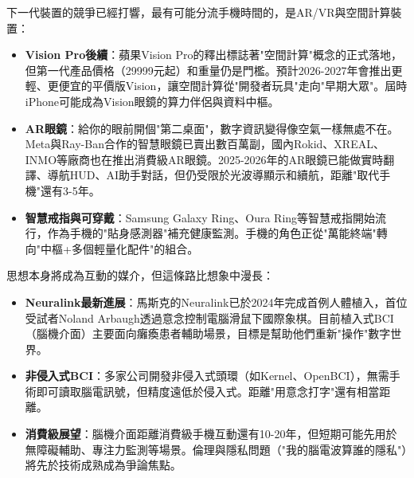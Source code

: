 


下一代裝置的競爭已經打響，最有可能分流手機時間的，是AR/VR與空間計算裝置：

\begin{itemize}
  \item \textbf{Vision Pro後續}：蘋果Vision Pro的釋出標誌著"空間計算"概念的正式落地，但第一代產品價格（29999元起）和重量仍是門檻。預計2026-2027年會推出更輕、更便宜的平價版Vision，讓空間計算從"開發者玩具"走向"早期大眾"。屆時iPhone可能成為Vision眼鏡的算力伴侶與資料中樞。
  \item \textbf{AR眼鏡}：給你的眼前開個"第二桌面"，數字資訊變得像空氣一樣無處不在。Meta與Ray-Ban合作的智慧眼鏡已賣出數百萬副，國內Rokid、XREAL、INMO等廠商也在推出消費級AR眼鏡。2025-2026年的AR眼鏡已能做實時翻譯、導航HUD、AI助手對話，但仍受限於光波導顯示和續航，距離"取代手機"還有3-5年。
  \item \textbf{智慧戒指與可穿戴}：Samsung Galaxy Ring、Oura Ring等智慧戒指開始流行，作為手機的"貼身感測器"補充健康監測。手機的角色正從"萬能終端"轉向"中樞+多個輕量化配件"的組合。
\end{itemize}


思想本身將成為互動的媒介，但這條路比想象中漫長：

\begin{itemize}
  \item \textbf{Neuralink最新進展}：馬斯克的Neuralink已於2024年完成首例人體植入，首位受試者Noland Arbaugh透過意念控制電腦滑鼠下國際象棋。目前植入式BCI（腦機介面）主要面向癱瘓患者輔助場景，目標是幫助他們重新"操作"數字世界。
  \item \textbf{非侵入式BCI}：多家公司開發非侵入式頭環（如Kernel、OpenBCI），無需手術即可讀取腦電訊號，但精度遠低於侵入式。距離"用意念打字"還有相當距離。
  \item \textbf{消費級展望}：腦機介面距離消費級手機互動還有10-20年，但短期可能先用於無障礙輔助、專注力監測等場景。倫理與隱私問題（"我的腦電波算誰的隱私"）將先於技術成熟成為爭論焦點。
\end{itemize}


